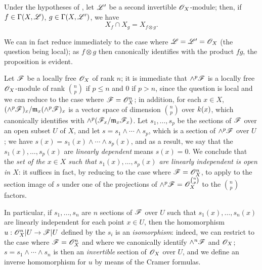 \begin{env}[5.5.3]
\label{0.5.5.3}
Under the hypotheses of , let $\mathscr{L}'$ be a second invertible $\mathscr{O}_X$-module;
then, if $f\in\Gamma(X,\mathscr{L})$, $g\in\Gamma(X,\mathscr{L}')$, we have
\[
  X_f\cap X_g=X_{f\otimes g}.
\]

We can in fact reduce immediately to the case where $\mathscr{L}=\mathscr{L}'=\mathscr{O}_X$ (the question being local);
as $f\otimes g$ then canonically identifies with the product $fg$, the proposition is evident.
\end{env}

\begin{env}[5.5.4]
\label{0.5.5.4}
Let $\mathscr{F}$ be a locally free $\mathscr{O}_X$ of rank $n$;
it is immediate that $\wedge^p\mathscr{F}$ is a locally free $\mathscr{O}_X$-module of rank $\binom{n}{p}$ if $p\leqslant n$ and $0$ if $p>n$, since the question is local and we can reduce to the case where $\mathscr{F}=\mathscr{O}_X^n$;
in addition, for each $x\in X$, $(\wedge^p\mathscr{F})_x/\mathfrak{m}_x(\wedge^p\mathscr{F})_x$ is a vector space of dimension $\binom{n}{p}$ over $k(x)$, which canonically identifies with $\wedge^p(\mathscr{F}_x/\mathfrak{m}_x\mathscr{F}_x)$.
Let $s_1,\dots,s_p$ be the sections of $\mathscr{F}$ over an open subset $U$ of $X$, and let $s=s_1\wedge\cdots\wedge s_p$, which is a section of $\wedge^p\mathscr{F}$ over $U$ ;
we have $s(x)=s_1(x)\wedge\cdots\wedge s_p(x)$, and as a result, we say that the $s_1(x),\dots,s_p(x)$ are \emph{linearly dependent} means $s(x)=0$.
We conclude that the \emph{set of the $x\in X$ such that $s_1(x),\dots,s_p(x)$ are linearly independent is open in $X$}: it suffices in fact, by reducing to the case where $\mathscr{F}=\mathscr{O}_X^n$, to apply  to the section image of $s$ under one of the projections of $\wedge^p\mathscr{F}=\mathscr{O}_X^{\binom{n}{p}}$ to the $\binom{n}{p}$ factors.

In particular, if $s_1,\dots,s_n$ are $n$ sections of $\mathscr{F}$ over $U$ such that $s_1(x),\dots,s_n(x)$ are linearly independent for each point $x\in U$, then the homomorphism $u:\OO_X^n|U\to\sh{F}|U$ defined by the $s_i$  is an \emph{isomorphism}:
indeed, we can restrict to the case where $\mathscr{F}=\mathscr{O}_X^n$ and where we canonically identify $\wedge^n\mathscr{F}$ and $\mathscr{O}_X$;
$s=s_1\wedge\cdots\wedge s_n$ is then an \emph{invertible} section of $\mathscr{O}_X$ over $U$, and we define an inverse homomorphism for $u$ by means of the Cramer formulas.
\end{env}


